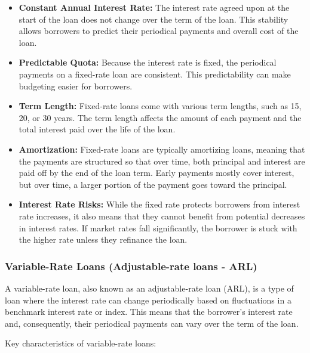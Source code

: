 \documentclass{article}
\begin{document}
\begin{itemize}
    \item \textbf{Constant Annual Interest Rate:} The interest rate agreed upon at the start of the loan does not change over the term of the loan. This stability allows borrowers to predict their periodical payments and overall cost of the loan.
    \item \textbf{Predictable Quota:} Because the interest rate is fixed, the periodical payments on a fixed-rate loan are consistent. This predictability can make budgeting easier for borrowers.
    \item \textbf{Term Length:} Fixed-rate loans come with various term lengths, such as 15, 20, or 30 years. The term length affects the amount of each payment and the total interest paid over the life of the loan.
    \item \textbf{Amortization:} Fixed-rate loans are typically amortizing loans, meaning that the payments are structured so that over time, both principal and interest are paid off by the end of the loan term. Early payments mostly cover interest, but over time, a larger portion of the payment goes toward the principal.
    \item \textbf{Interest Rate Risks:} While the fixed rate protects borrowers from interest rate increases, it also means that they cannot benefit from potential decreases in interest rates. If market rates fall significantly, the borrower is stuck with the higher rate unless they refinance the loan.
\end{itemize}

\subsubsection{Variable-Rate Loans (Adjustable-rate loans - ARL)}
A variable-rate loan, also known as an adjustable-rate loan (ARL), is a type of loan where the interest rate can change periodically based on fluctuations in a benchmark interest rate or index. This means that the borrower's interest rate and, consequently, their periodical payments can vary over the term of the loan.

Key characteristics of variable-rate loans:
\end{document}
